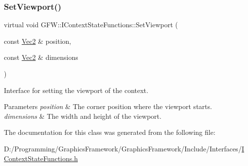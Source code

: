 \subsubsection{\texorpdfstring{Set\+Viewport()}{SetViewport()}}
{\footnotesize\ttfamily virtual void G\+F\+W\+::\+I\+Context\+State\+Functions\+::\+Set\+Viewport (\begin{DoxyParamCaption}\item[{const \hyperlink{namespace_g_f_w_1_1_math_af5ba989006b289f1e575dd7a911c1521}{Vec2} \&}]{position,  }\item[{const \hyperlink{namespace_g_f_w_1_1_math_af5ba989006b289f1e575dd7a911c1521}{Vec2} \&}]{dimensions }\end{DoxyParamCaption})\hspace{0.3cm}{\ttfamily [pure virtual]}}



Interface for setting the viewport of the context. 


\begin{DoxyParams}{Parameters}
{\em position} & The corner position where the viewport starts. \\
\hline
{\em dimensions} & The width and height of the viewport. \\
\hline
\end{DoxyParams}


The documentation for this class was generated from the following file\+:\begin{DoxyCompactItemize}
\item 
D\+:/\+Programming/\+Graphics\+Framework/\+Graphics\+Framework/\+Include/\+Interfaces/\hyperlink{_i_context_state_functions_8h}{I\+Context\+State\+Functions.\+h}\end{DoxyCompactItemize}
